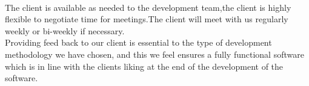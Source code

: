 \newline \\
The client is available as needed to the development team,the client is highly flexible to negotiate
time for meetings.The client will meet with us regularly weekly or bi-weekly if necessary.
\newline \\
Providing feed back to our client is essential to the type of development methodology we have chosen,
and this we feel ensures a fully functional software which is in line with the clients liking at the
end of the development of the software.
